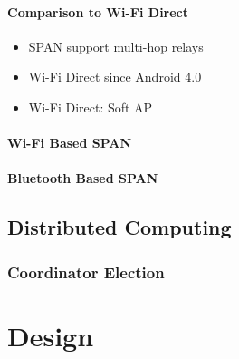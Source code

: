 			\subsubsection*{Comparison to Wi-Fi Direct}
			
			{\color{gray} 
				\begin{itemize}  
					\item SPAN support multi-hop relays
					\item Wi-Fi Direct since Android 4.0
					\item Wi-Fi Direct: Soft AP 
				\end{itemize}
			}
		
			\subsubsection*{Wi-Fi Based \gls{SPAN}}
	
			\subsubsection*{Bluetooth Based \gls{SPAN}}
			
	\section{Distributed Computing}
	
		\subsection*{Coordinator Election}
	

\chapter{Design }

	
	
	
